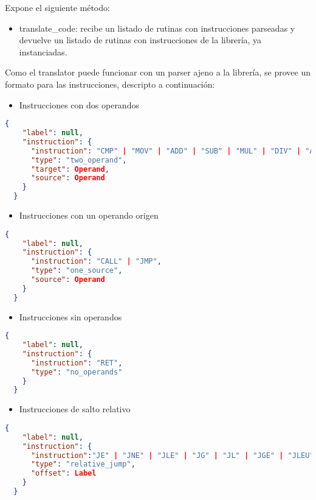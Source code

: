 Expone el siguiente método:
\begin{itemize}
  \item translate\_code: recibe un listado de rutinas con instrucciones parseadas y devuelve un listado de rutinas con instrucciones de la librería, ya instanciadas.
\end{itemize}

Como el translator puede funcionar con un parser ajeno a la librería, se provee un formato para las instrucciones, descripto a continuación:

\begin{itemize}
  \item Instrucciones con dos operandos
\end{itemize}
\begin{minipage}{\textwidth} 
  \begin{lstlisting}[language=json,firstnumber=0]
  {
    "label": null,
    "instruction": {
      "instruction": "CMP" | "MOV" | "ADD" | "SUB" | "MUL" | "DIV" | "AND" | "OR",
      "type": "two_operand",
      "target": Operand,
      "source": Operand
    }
  }
  \end{lstlisting}
\end{minipage}

\begin{itemize}
  \item Instrucciones con un operando origen
\end{itemize}
\begin{minipage}{\textwidth} 
  \begin{lstlisting}[language=json,firstnumber=0]
  {
    "label": null,
    "instruction": {
      "instruction": "CALL" | "JMP",
      "type": "one_source",
      "source": Operand
    }
  }
  \end{lstlisting}
\end{minipage}

\begin{itemize}
  \item Instrucciones sin operandos
\end{itemize}
\begin{minipage}{\textwidth} 
  \begin{lstlisting}[language=json,firstnumber=0]
  {
    "label": null,
    "instruction": {
      "instruction": "RET",
      "type": "no_operands"
    }
  }
  \end{lstlisting}
\end{minipage}

\begin{itemize}
  \item Instrucciones de salto relativo
\end{itemize}
\begin{minipage}{\textwidth} 
  \begin{lstlisting}[language=json,firstnumber=0]
  {
    "label": null,
    "instruction": {
      "instruction":"JE" | "JNE" | "JLE" | "JG" | "JL" | "JGE" | "JLEU" | "JGU" | "JCS" | "JNEG" | "JVS",
      "type": "relative_jump",
      "offset": Label
    }
  }
  \end{lstlisting}
\end{minipage}

